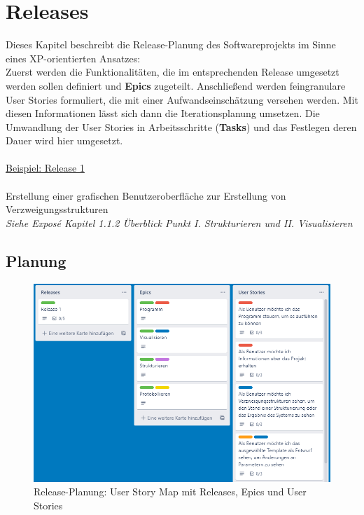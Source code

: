 \documentclass[11pt]{article}
\begin{document}
    \newpage

    \section{Releases}
    Dieses Kapitel beschreibt die Release-Planung des Softwareprojekts im Sinne eines XP-orientierten Ansatzes:\\
    Zuerst werden die Funktionalitäten, die im entsprechenden Release umgesetzt werden sollen definiert und \textbf{Epics}
    zugeteilt.
    Anschließend werden feingranulare User Stories formuliert, die mit einer Aufwandseinschätzung versehen werden.
    Mit diesen Informationen lässt sich dann die Iterationsplanung umsetzen.
    Die Umwandlung der User Stories in Arbeitsschritte (\textbf{Tasks}) und das Festlegen deren Dauer wird hier
    umgesetzt.\\~\\
    \underline{Beispiel: Release 1}\\~\\
    Erstellung einer grafischen Benutzeroberfläche zur Erstellung von Verzweigungsstrukturen\\
    \textit{Siehe Exposé Kapitel 1.1.2 Überblick Punkt I. Strukturieren und II. Visualisieren}
    
    \subsection{Planung}
    \begin{figure}[H]
        \centering
        \includegraphics[width=12cm]{../images/User_Story_Map.PNG}
        \caption{Release-Planung: User Story Map mit Releases, Epics und User Stories}
    \end{figure}
\end{document}
